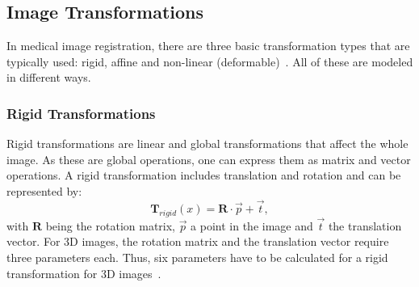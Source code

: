 \subsection{Image Transformations} \label{SubSec:ImageTransformations}
In medical image registration, there are three basic transformation types that are typically used: rigid, affine and non-linear (deformable)~\cite{Strittmatter2023}. All of these are modeled in different ways.

\subsubsection{Rigid Transformations}
Rigid transformations are linear and global transformations that affect the whole image. As these are global operations, one can express them as matrix and vector operations. A rigid transformation includes translation and rotation and can be represented by:
\begin{equation}
	\mathbf{T}_{rigid} (x) = \mathbf{R} \cdot \overrightarrow{p} + \overrightarrow{t},
\end{equation}
with $\mathbf{R}$ being the rotation matrix, $\overrightarrow{p}$ a point in the image and $\overrightarrow{t}$ the translation vector.  For 3D images, the rotation matrix and the translation vector require three parameters each. Thus, six parameters have to be calculated for a rigid transformation for 3D images~\cite{Strittmatter2023}.

